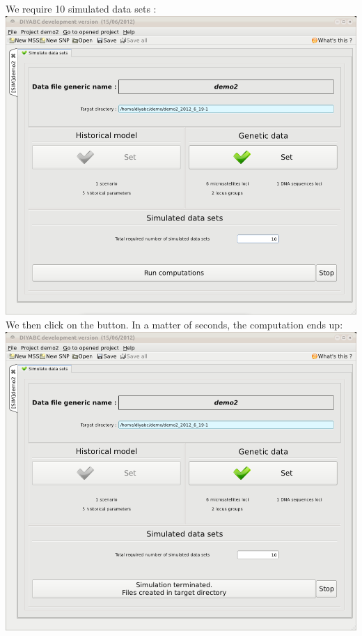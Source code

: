 We require 10 simulated data sets :\\


\includegraphics[scale=0.33]{gui_pictures/Capture-DIYABC-85} \\


\newpage{}We then click on the 
button. In a matter of seconds, the computation ends up:\\


\includegraphics[scale=0.33]{gui_pictures/Capture-DIYABC-86} \\


